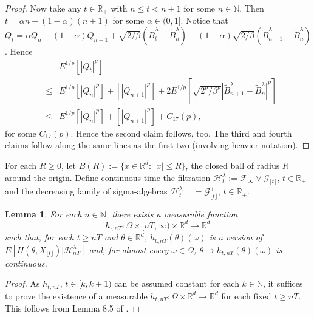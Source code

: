 \documentclass[a4paper,draft]{article}
\newtheorem{lemma}[theorem]{Lemma}
\begin{document}
\begin{proof}
Now take any $t\in\mathbb{R}_+$ with $n\leq t<n+1$ for some $n\in\mathbb{N}$.
Then $t=\alpha n+(1-\alpha)(n+1)$ for some $\alpha\in (0,1]$.
Notice that $Q_t=\alpha Q_n +(1-\alpha)Q_{n+1}+\sqrt{2/\beta}(\tilde{B}^{\lambda}_{t}-\tilde{B}^{\lambda}_n)-
(1-\alpha)\sqrt{2/\beta}(\tilde{B}^{\lambda}_{n+1}-\tilde{B}^{\lambda}_n)$.
Hence
\begin{eqnarray*}
& & E^{1/p}[|Q_t|^p]\\
&\leq&  E^{1/p}[|Q_n|^p]+[|Q_{n+1}|^p]+2E^{1/p}[\sqrt{2^p/\beta^p}|\tilde{B}^{\lambda}_{n+1}-\tilde{B}^{\lambda}_n|^p]\\
&\leq& E^{1/p}[|Q_n|^p]+[|Q_{n+1}|^p]+C_{17}(p),
\end{eqnarray*}
for some $C_{17}(p)$. Hence the second claim follows, too. The third and fourth claims
follow along the same lines as the first two (involving heavier notation).
\end{proof}

For each $R\geq 0$, let $B(R):=\{x\in\mathbb{R}^d:\, |x|\leq R\}$, the closed
ball of radius $R$ around the origin.
Define continuous-time the filtration
$\mathcal{H}_t^{\lambda}:=\mathcal{F}_{\infty}\vee \mathcal{G}_{\lfloor t\rfloor}$, $t\in\mathbb{R}_+$ and
the decreasing family of sigma-algebras
$\mathcal{H}_t^{\lambda+}:=\mathcal{G}^+_{\lfloor t\rfloor}$, $t\in\mathbb{R}_+$.


\begin{lemma}\label{haa} For each
$n\in\mathbb{N}$,
there exists a measurable function
$$
h_{\cdot,nT}:\Omega\times [nT,\infty)\times
\mathbb{R}^d\to\mathbb{R}^d
$$
such that, for each $t\geq nT$ and $\theta\in\mathbb{R}^d$, $h_{t,nT}(\theta)(\omega)$
is a version of $E[H(\theta,X_{\lfloor t\rfloor})\vert \mathcal{H}_{nT}^{\lambda}]$ and,
for almost every $\omega\in\Omega$, $\theta\to h_{t,nT}(\theta)(\omega)$ is continuous.
\end{lemma}
\begin{proof}
As $h_{t,nT}$, $t\in [k,k+1)$ can be assumed constant
for each $k\in\mathbb{N}$, it suffices to prove the existence of a measurable
$h_{t,nT}:\Omega\times\mathbb{R}^d\to\mathbb{R}^d$ for each fixed $t\geq nT$.
This follows from Lemma 8.5 of \cite{convex}.
\end{proof}
\end{document}
